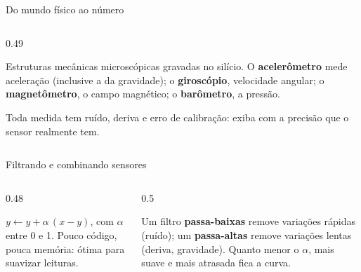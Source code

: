 \begin{frame}{Do mundo físico ao número}
\begin{columns}[T]
\begin{column}{0.49\textwidth}
      \begin{definicao}
        Estruturas mecânicas microscópicas gravadas no silício. O \textbf{acelerômetro} mede aceleração (inclusive a da gravidade); o \textbf{giroscópio}, velocidade angular; o \textbf{magnetômetro}, o campo magnético; o \textbf{barômetro}, a pressão.
      \end{definicao}
      \begin{atencao}
        Toda medida tem ruído, deriva e erro de calibração: exiba com a precisão que o sensor realmente tem.
      \end{atencao}
    \end{column}
  \end{columns}
\end{frame}

\begin{frame}{Filtrando e combinando sensores}
  \begin{columns}[c]
    \begin{column}{0.48\textwidth}
      \centering
      \begin{definicao}
        $y \leftarrow y + \alpha\,(x - y)$, com $\alpha$ entre 0 e 1. Pouco código, pouca memória: ótima para suavizar leituras.
      \end{definicao}
    \end{column}
    \begin{column}{0.5\textwidth}
      \begin{conceito}
        Um filtro \textbf{passa-baixas} remove variações rápidas (ruído); um \textbf{passa-altas} remove variações lentas (deriva, gravidade). Quanto menor o $\alpha$, mais suave e mais atrasada fica a curva.

\end{conceito}
\end{column}
\end{columns}
\end{frame}
